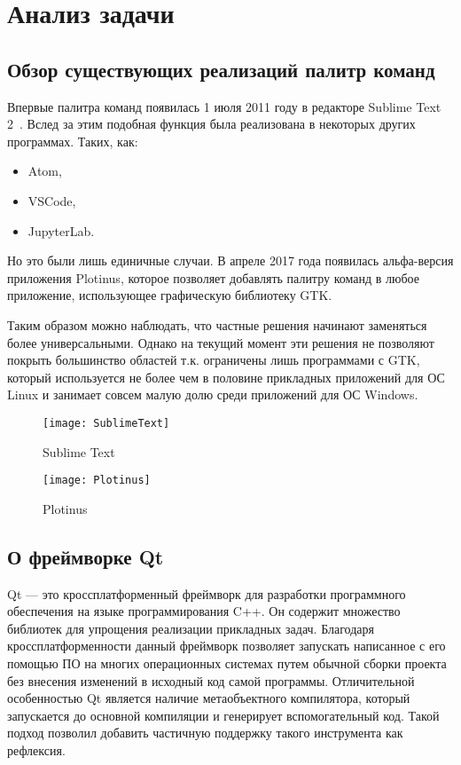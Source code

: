 \chapter{Анализ задачи}

\section{Обзор существующих реализаций палитр команд}\label{analogs}

Впервые палитра команд появилась 1 июля 2011 году в редакторе Sublime Text
2~\cite{sublimetext2changelog}. Вслед за этим подобная функция была реализована
в некоторых других программах. Таких, как:
\begin{itemize}
	\item Atom\cite{atom},
	\item VSCode\cite{vscode},
	\item JupyterLab\cite{jupyterlab}.
\end{itemize}

Но это были лишь единичные случаи. В апреле 2017 года появилась альфа-версия
приложения Plotinus\cite{plotinus}, которое позволяет добавлять палитру команд в
любое приложение, использующее графическую библиотеку GTK.

Таким образом можно наблюдать, что частные решения начинают заменяться более
универсальными. Однако на текущий момент эти решения не позволяют покрыть
большинство областей т.к. ограничены лишь программами с GTK, который
используется не более чем в половине прикладных приложений для ОС Linux и
занимает совсем малую долю среди приложений для ОС Windows.

\begin{figure}[h]
	\centering
	\texttt{[image: SublimeText]}
	\label{sublimetext}
	\caption{Sublime Text}
\end{figure}

\begin{figure}[h]
	\centering
	\texttt{[image: Plotinus]}
	\caption{Plotinus}
\end{figure}

\section{О фреймворке Qt}

Qt — это кроссплатформенный фреймворк для разработки программного обеспечения
на языке программирования C++\cite{qtabout}. Он содержит множество библиотек для
упрощения реализации прикладных задач. Благодаря кроссплатформенности данный
фреймворк позволяет запускать написанное с его помощью ПО на многих операционных
системах путем обычной сборки проекта без внесения изменений в исходный код
самой программы. Отличительной особенностью Qt является наличие метаобъектного
компилятора, который запускается до основной компиляции и генерирует
вспомогательный код. Такой подход позволил добавить частичную поддержку такого
инструмента как рефлексия.

